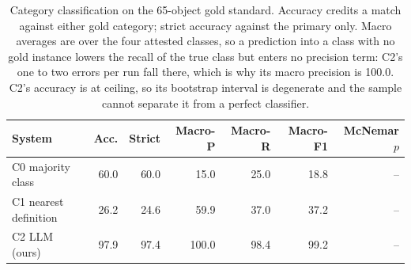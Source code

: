 \begin{table}[t]
\centering
\small
\begin{tabular}{lrrrrrr}
\toprule
System & Acc. & Strict & Macro-P & Macro-R & Macro-F1 & McNemar $p$ \\
\midrule
C0 majority class & 60.0 & 60.0 & 15.0 & 25.0 & 18.8 & -- \\
C1 nearest definition & 26.2 & 24.6 & 59.9 & 37.0 & 37.2 & -- \\
C2 LLM (ours) & 97.9 & 97.4 & 100.0 & 98.4 & 99.2 & -- \\
\bottomrule
\end{tabular}
\caption{Category classification on the 65-object gold standard. Accuracy credits a match against either gold category; strict accuracy against the primary only. Macro averages are over the four attested classes, so a prediction into a class with no gold instance lowers the recall of the true class but enters no precision term: C2's one to two errors per run fall there, which is why its macro precision is 100.0. C2's accuracy is at ceiling, so its bootstrap interval is degenerate and the sample cannot separate it from a perfect classifier.}
\label{tab:category}
\end{table}
